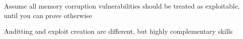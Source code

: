 \documentclass[Screen16to9,17pt]{foils}
\begin{document}




\begin{list2}
\item Assume all memory corruption vulnerabilities should be treated as exploitable, until you can prove otherwise
\item Auditting and exploit creation are different, but highly complementary skills
\item
\end{list2}



\begin{list2}
\item
\item
\item
\end{list2}



\slide{}

\begin{list2}
\item
\item
\item
\end{list2}

\slide{}

\begin{list2}
\item
\item
\item
\end{list2}

\slide{}

\begin{list2}
\item
\item
\item
\end{list2}

\slide{}

\begin{list2}
\item
\item
\item
\end{list2}


\end{document}
